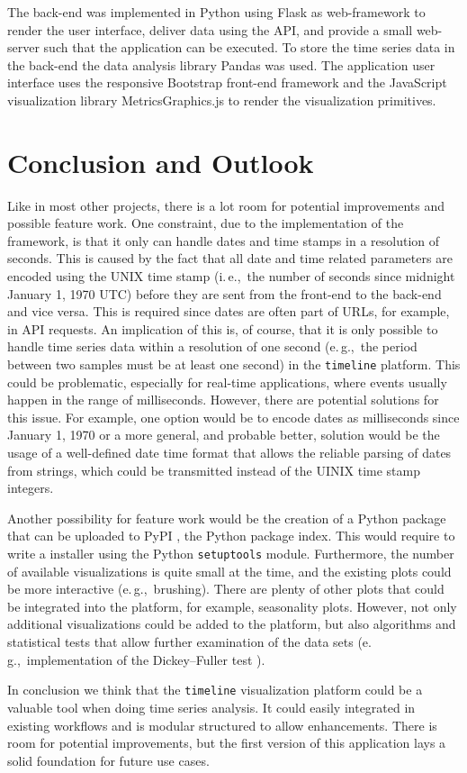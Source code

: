 \documentclass[runningheads,a4paper,11pt]{llncs}
\newcommand{\eg}{e.\,g.,\ }
\newcommand{\ie}{i.\,e.,\ }
\begin{document}
The back-end was implemented in Python using Flask \cite{Flask} as web-framework to render the user interface, deliver data using the API, and provide a small web-server such that the application can be executed.
To store the time series data in the back-end the data analysis library Pandas \cite{McKinney2010} was used. 
The application user interface uses the responsive Bootstrap \cite{Bootstrap} front-end framework and the JavaScript visualization library MetricsGraphics.js \cite{MetricsGraphics} to render the visualization primitives. 


\section{Conclusion and Outlook}\label{sec:conclusion}

Like in most other projects, there is a lot room for potential improvements and possible feature work.
One constraint, due to the implementation of the framework, is that it only can handle dates and time stamps in a resolution of seconds.
This is caused by the fact that all date and time related parameters are encoded using the UNIX time stamp (\ie the number of seconds since midnight January 1, 1970 UTC) before they are sent from the front-end to the back-end and vice versa.
This is required since dates are often part of URLs, for example, in API requests.
An implication of this is, of course, that it is only possible to handle time series data within a resolution of one second (\eg the period between two samples must be at least one second) in the \texttt{timeline} platform.
This could be problematic, especially for real-time applications, where events usually happen in the range of milliseconds.
However, there are potential solutions for this issue.
For example, one option would be to encode dates as milliseconds since January 1, 1970 or a more general, and probable better, solution would be the usage of a well-defined date time format that allows the reliable parsing of dates from strings, which could be transmitted instead of the UINIX time stamp integers.

Another possibility for feature work would be the creation of a Python package that can be uploaded to PyPI \cite{PyPI}, the Python package index.
This would require to write a installer using the Python \texttt{setuptools} module. 
Furthermore, the number of available visualizations is quite small at the time, and the existing plots could be more interactive (\eg brushing).
There are plenty of other plots that could be integrated into the platform, for example, seasonality plots.
However, not only additional visualizations could be added to the platform, but also algorithms and statistical tests that allow further examination of the data sets (\eg implementation of the Dickey--Fuller test \cite{Dickey1979}).

In conclusion we think that the \texttt{timeline} visualization platform could be a valuable tool when doing time series analysis.
It could easily integrated in existing workflows and is modular structured to allow enhancements. 
There is room for potential improvements, but the first version of this application lays a solid foundation for future use cases. 



\end{document}
